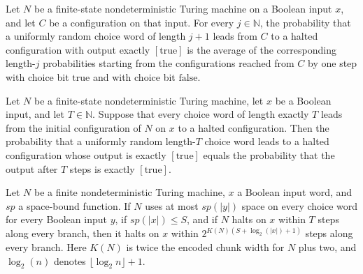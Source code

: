 \begin{theorem}
\label{Randomized.PolyAmp.accP_succ}
\leanok
{}
Let $N$ be a finite-state nondeterministic Turing machine on a Boolean input $x$, and
let $C$ be a configuration on that input. For every $j\in\mathbb{N}$, the probability
that a uniformly random choice word of length $j+1$ leads from $C$ to a halted
configuration with output exactly $[\mathrm{true}]$ is the average of the corresponding
length-$j$ probabilities starting from the configurations reached from $C$ by one step
with choice bit $\mathrm{true}$ and with choice bit $\mathrm{false}$.
\end{theorem}

\begin{theorem}
\label{Randomized.PolyAmp.accP_init}
\leanok
{}
Let $N$ be a finite-state nondeterministic Turing machine, let $x$ be a Boolean input,
and let $T\in\mathbb{N}$. Suppose that every choice word of length exactly $T$ leads
from the initial configuration of $N$ on $x$ to a halted configuration. Then the
probability that a uniformly random length-$T$ choice word leads to a halted
configuration whose output is exactly $[\mathrm{true}]$ equals the probability that the
output after $T$ steps is exactly $[\mathrm{true}]$.
\end{theorem}

\begin{theorem}
\label{Randomized.PolyAmp.haltsWithin_codeBound}
\leanok
{}
Let $N$ be a finite nondeterministic Turing machine, $x$ a Boolean input word, and $sp$
a space-bound function. If $N$ uses at most $sp(|y|)$ space on every choice word for
every Boolean input $y$, if $sp(|x|)\le S$, and if $N$ halts on $x$ within $T$ steps
along every branch, then it halts on $x$ within $2^{K(N)(S+\log_2(|x|)+1)}$ steps along
every branch. Here $K(N)$ is twice the encoded chunk width for $N$ plus two, and
$\log_2(n)$ denotes $\lfloor\log_2 n\rfloor+1$.
\end{theorem}

